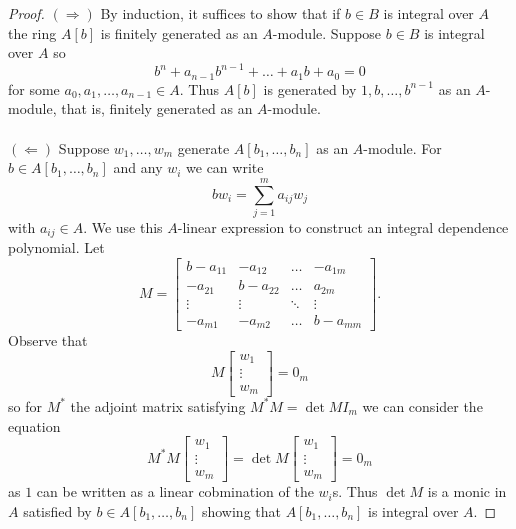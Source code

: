 \documentclass{amsart}
\theoremstyle{definition}
\numberwithin{equation}{section}
\begin{document}
\begin{proof}
  $(\Longrightarrow)$ By induction, it suffices to show that if $b\in B$ is integral over $A$ the ring $A[b]$ is finitely generated as an $A$-module. Suppose $b\in B$ is integral over $A$ so 
  $$b^{n}+a_{n-1}b^{n-1}+\dots+a_{1}b+a_{0}=0$$
  for some $a_{0}, a_{1},\dots, a_{n-1}\in A$. Thus $A[b]$ is generated by $1, b, \dots,b^{n-1}$ as an $A$-module, that is, finitely generated as an $A$-module. 
  \\\\
  $(\Longleftarrow)$ Suppose $w_{1},\dots,w_{m}$ generate $A[b_{1},\dots,b_{n}]$ as an $A$-module. For $b\in A[b_{1},\dots,b_{n}]$ and any $w_{i}$ we can write 
  $$bw_{i}=\sum_{j=1}^{m}a_{ij}w_{j}$$
  with $a_{ij}\in A$. We use this $A$-linear expression to construct an integral dependence polynomial. Let 
  $$M=\begin{bmatrix}
    b-a_{11} & -a_{12} & \dots & -a_{1m} \\
    -a_{21} & b-a_{22} & \dots & a_{2m} \\
    \vdots & \vdots & \ddots & \vdots \\
    -a_{m1} & -a_{m2} & \dots & b-a_{mm}
  \end{bmatrix}.$$
  Observe that 
  $$M\begin{bmatrix}
    w_{1} \\ \vdots \\ w_{m}
  \end{bmatrix}=0_{m}$$
  so for $M^{*}$ the adjoint matrix satisfying $M^{*}M=\det M I_{m}$ we can consider the equation 
  $$M^{*}M\begin{bmatrix} w_{1}\\ \vdots\\ w_{m}\end{bmatrix}=\det M\begin{bmatrix}
    w_{1} \\ \vdots \\ w_{m}
  \end{bmatrix}=0_{m}$$
  as $1$ can be written as a linear cobmination of the $w_{i}$s. Thus $\det M$ is a monic in $A$ satisfied by $b\in A[b_{1},\dots,b_{n}]$ showing that $A[b_{1},\dots,b_{n}]$ is integral over $A$. 
\end{proof}
\end{document}
